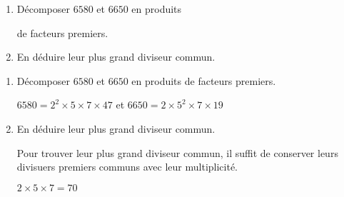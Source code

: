 \begin{exercice*}
    \begin{enumerate}
        \item Décomposer $\num{6580}$ et $\num{6650}$ en produits
        
        de facteurs premiers.
        \item En déduire leur plus grand diviseur commun.
    \end{enumerate}    
\end{exercice*}
\begin{corrige}
    \begin{enumerate}
        \item Décomposer $\num{6580}$ et $\num{6650}$ en produits de facteurs premiers.
        
        $\num{6580}=2^2\times 5\times 7\times 47$ et $\num{6650}=2\times 5^2\times 7\times 19$
        \item En déduire leur plus grand diviseur commun.
        
        Pour trouver leur plus grand diviseur commun, il suffit de conserver leurs divisuers premiers communs avec leur multiplicité.

        $2\times 5\times 7 = 70$        
    \end{enumerate}
\end{corrige}

